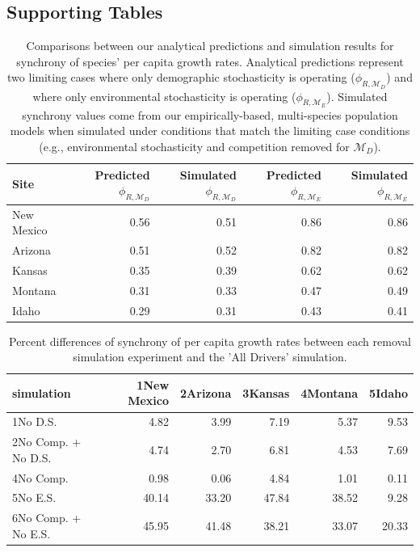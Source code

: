 \documentclass[12pt,]{article}
\begin{document}
\newpage{}

\subsection{Supporting Tables}\label{supporting-tables}

\begin{table}[ht]
\centering
\caption{Comparisons between our analytical predictions and simulation results for synchrony of species' per capita growth rates. Analytical predictions represent two limiting cases where only demographic stochasticity is operating ($\phi_{R,\mathcal{M}_D}$) and where only environmental stochasticity is operating ($\phi_{R,\mathcal{M}_E}$). Simulated synchrony values come from our empirically-based, multi-species population models when simulated under conditions that match the limiting case conditions (e.g., environmental stochasticity and competition removed for $\mathcal{M}_D$).} 
{\normalsize
\begin{tabular}{lrrrr}
  \hline
Site & Predicted $\phi_{R,\mathcal{M}_D}$ & Simulated $\phi_{R,\mathcal{M}_D}$ & Predicted $\phi_{R,\mathcal{M}_E}$ & Simulated $\phi_{R,\mathcal{M}_E}$ \\ 
  \hline
New Mexico & 0.56 & 0.51 & 0.86 & 0.86 \\ 
  Arizona & 0.51 & 0.52 & 0.82 & 0.82 \\ 
  Kansas & 0.35 & 0.39 & 0.62 & 0.62 \\ 
  Montana & 0.31 & 0.33 & 0.47 & 0.49 \\ 
  Idaho & 0.29 & 0.31 & 0.43 & 0.41 \\ 
   \hline
\end{tabular}
}
\end{table}

\begin{table}[ht]
\centering
\caption{Percent differences of synchrony of per capita growth rates between each removal simulation experiment and the 'All Drivers' simulation.} 
\begin{tabular}{lrrrrr}
  \hline
simulation & 1New Mexico & 2Arizona & 3Kansas & 4Montana & 5Idaho \\ 
  \hline
1No D.S. & 4.82 & 3.99 & 7.19 & 5.37 & 9.53 \\ 
  2No Comp. + No D.S. & 4.74 & 2.70 & 6.81 & 4.53 & 7.69 \\ 
  4No Comp. & 0.98 & 0.06 & 4.84 & 1.01 & 0.11 \\ 
  5No E.S. & 40.14 & 33.20 & 47.84 & 38.52 & 9.28 \\ 
  6No Comp. + No E.S. & 45.95 & 41.48 & 38.21 & 33.07 & 20.33 \\ 
   \hline
\end{tabular}
\end{table}
\end{document}
